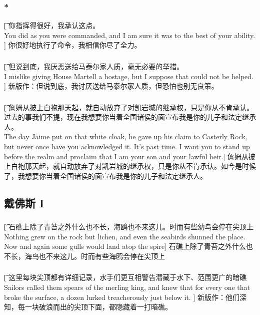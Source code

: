 \documentclass[12pt,a4paper]{article}
\begin{document}
\subsubsection{\color{red}*}\t[
	你指挥得很好，我承认这点。\\
	You did as you were commanded, and I am sure it was to the best of your ability. ]
	你很好地执行了命令，我相信你尽了全力。
	
\subsubsection{}\t[
	但说到底，我厌恶送给马泰尔家人质，毫无必要的举措。\\
	I mislike giving House Martell a hostage, but I suppose that could not be helped. ]
	新版作：但说到底，我讨厌送给马泰尔家人质，但恐怕也别无良策。
	
\subsubsection{}\t[
	詹姆从披上白袍那天起，就自动放弃了对凯岩城的继承权，只是你从不肯承认。过去的事我们不提，现在我想要你当着全国诸侯的面宣布我是你的儿子和法定继承人。\\
	The day Jaime put on that white cloak, he gave up his claim to Casterly Rock, but never once have you acknowledged it. It's past time. I want you to stand up before the realm and proclaim that I am your son and your lawful heir.]
	詹姆从披上白袍那天起，就自动放弃了对凯岩城的继承权，只是你从不肯承认。如今是时候了，我想要你当着全国诸侯的面宣布我是你的儿子和法定继承人。
	

\subsection{戴佛斯 I}
\subsubsection{}\t[
	石礁上除了青苔之外什么也不长，海鸥也不来这儿。时而有些幼鸟会停在尖顶上\\
	Nothing grew on the rock but lichen, and even the seabirds shunned the place. Now and again some gulls would land atop the spire]
	石礁上除了青苔之外什么也不长，海鸟也不来这儿。时而有些海鸥会停在尖顶上
	
\subsubsection{}\t[
	这里每块尖顶都有详细记录，水手们更互相警告潜藏于水下、范围更广的暗礁\\
	Sailors called them spears of the merling king, and knew that for every one that broke the surface, a dozen lurked treacherously just below it. ]
	新版作：他们深知，每一块破浪而出的尖顶下面，都隐藏着一打暗礁。
	
\end{document}
